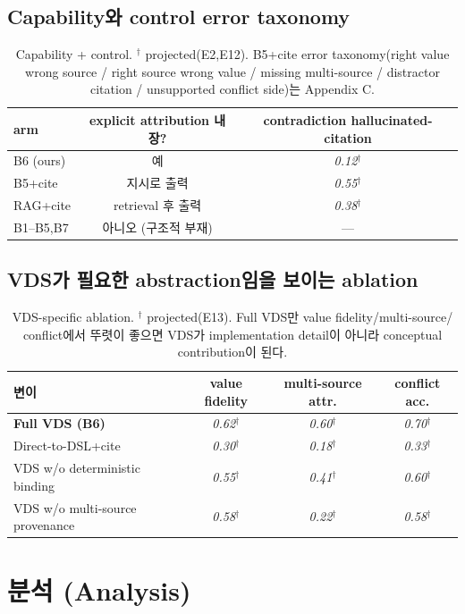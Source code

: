 \documentclass[11pt]{article}
\newcommand{\proj}[1]{\textit{#1}$^\dagger$}
\begin{document}
\subsection{Capability와 control error taxonomy}
\begin{table}[h]
\centering\small
\begin{tabular}{lcc}
\toprule
arm & explicit attribution 내장? & contradiction hallucinated-citation \\
\midrule
B6 (ours) & 예 & \proj{0.12} \\
B5+cite & 지시로 출력 & \proj{0.55} \\
RAG+cite & retrieval 후 출력 & \proj{0.38} \\
B1--B5,B7 & 아니오 (구조적 부재) & --- \\
\bottomrule
\end{tabular}
\caption{Capability + control. $^\dagger$ projected(E2,E12). B5+cite error taxonomy(right value
wrong source / right source wrong value / missing multi-source / distractor citation /
unsupported conflict side)는 Appendix C.}
\label{tab:capability}
\end{table}

\subsection{VDS가 필요한 abstraction임을 보이는 ablation}
\begin{table}[h]
\centering\small
\begin{tabular}{lccc}
\toprule
변이 & value fidelity & multi-source attr. & conflict acc. \\
\midrule
\textbf{Full VDS (B6)} & \proj{0.62} & \proj{0.60} & \proj{0.70} \\
Direct-to-DSL+cite & \proj{0.30} & \proj{0.18} & \proj{0.33} \\
VDS w/o deterministic binding & \proj{0.55} & \proj{0.41} & \proj{0.60} \\
VDS w/o multi-source provenance & \proj{0.58} & \proj{0.22} & \proj{0.58} \\
\bottomrule
\end{tabular}
\caption{VDS-specific ablation. $^\dagger$ projected(E13). Full VDS만 value fidelity/multi-source/
conflict에서 뚜렷이 좋으면 VDS가 implementation detail이 아니라 conceptual contribution이 된다.}
\label{tab:vdsabl}
\end{table}

\section{분석 (Analysis)}
\label{sec:analysis}
\end{document}
